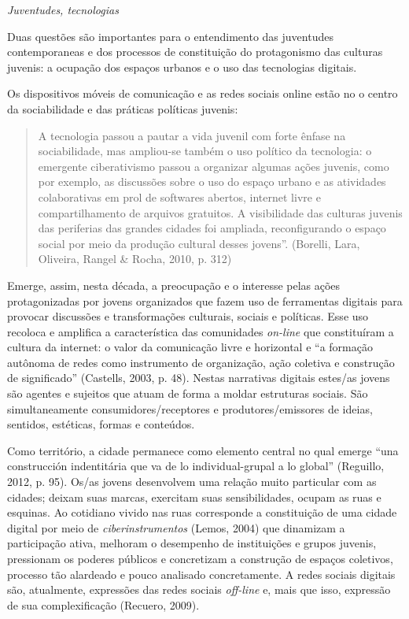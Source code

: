 \emph{Juventudes, tecnologias}

Duas questões são importantes para o entendimento das juventudes
contemporaneas e dos processos de constituição do protagonismo das
culturas juvenis: a ocupação dos espaços urbanos e o uso das tecnologias
digitais.

Os dispositivos móveis de comunicação e as redes sociais online estão no
o centro da sociabilidade e das práticas políticas juvenis:

\begin{quote}
A tecnologia passou a pautar a vida juvenil com forte ênfase na
sociabilidade, mas ampliou-se também o uso político da tecnologia: o
emergente ciberativismo passou a organizar algumas ações juvenis, como
por exemplo, as discussões sobre o uso do espaço urbano e as atividades
colaborativas em prol de softwares abertos, internet livre e
compartilhamento de arquivos gratuitos. A visibilidade das culturas
juvenis das periferias das grandes cidades foi ampliada, reconfigurando
o espaço social por meio da produção cultural desses jovens''. (Borelli,
Lara, Oliveira, Rangel \& Rocha, 2010, p. 312)
\end{quote}

Emerge, assim, nesta década, a preocupação e o interesse pelas ações
protagonizadas por jovens organizados que fazem uso de ferramentas
digitais para provocar discussões e transformações culturais, sociais e
políticas. Esse uso recoloca e amplifica a característica das
comunidades \emph{on-line} que constituíram a cultura da internet: o
valor da comunicação livre e horizontal e ``a formação autônoma de redes
como instrumento de organização, ação coletiva e construção de
significado'' (Castells, 2003, p. 48). Nestas narrativas digitais
estes/as jovens são agentes e sujeitos que atuam de forma a moldar
estruturas sociais. São simultaneamente consumidores/receptores e
produtores/emissores de ideias, sentidos, estéticas, formas e conteúdos.

Como território, a cidade permanece como elemento central no qual emerge
``una construcción indentitária que va de lo individual-grupal a lo
global'' (Reguillo, 2012, p. 95). Os/as jovens desenvolvem uma relação
muito particular com as cidades; deixam suas marcas, exercitam suas
sensibilidades, ocupam as ruas e esquinas. Ao cotidiano vivido nas ruas
corresponde a constituição de uma cidade digital por meio de
\emph{ciberinstrumentos} (Lemos, 2004) que dinamizam a participação
ativa, melhoram o desempenho de instituições e grupos juvenis,
pressionam os poderes públicos e concretizam a construção de espaços
coletivos, processo tão alardeado e pouco analisado concretamente. A
redes sociais digitais são, atualmente, expressões das redes sociais
\emph{off-line} e, mais que isso, expressão de sua complexificação
(Recuero, 2009).

